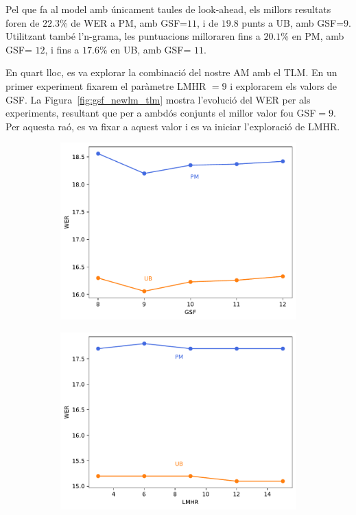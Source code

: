 Pel que fa al model amb únicament taules de look-ahead, els millors resultats foren de $22.3$\% de WER a PM, amb GSF=$11$, i de $19.8$ punts a UB, amb GSF=$9$. Utilitzant també l'n-grama, les puntuacions milloraren fins a $20.1$\% en PM, amb GSF= $12$, i fins a $17.6$\% en UB, amb GSF= $11$.

En quart lloc, es va explorar la combinació del nostre AM amb el TLM. En un primer experiment fixarem el paràmetre LMHR $=9$ i explorarem els valors de GSF. La Figura~\ref{fig:gsf_newlm_tlm} mostra l'evolució del WER per als experiments, resultant que per a ambdós conjunts el millor valor fou GSF$=9$. Per aquesta raó, es va fixar a aquest valor i es va iniciar l'exploració de LMHR.

\begin{figure}[ht!]
    \centering
    \begin{subfigure}{0.45\textwidth}
        \centering
        \includegraphics[width=\textwidth]{figuras/gsf_tlm.pdf}
    \end{subfigure}
    \begin{subfigure}{0.45\textwidth}
        \centering
        \includegraphics[width=\textwidth]{figuras/lmhr_tlm.pdf}

\end{subfigure}
\end{figure}
